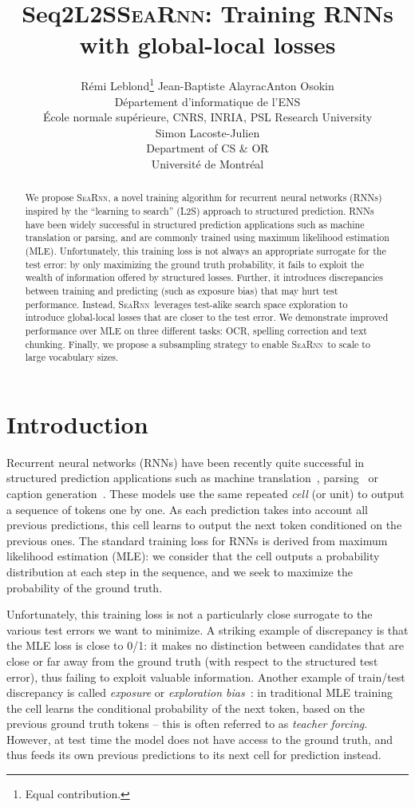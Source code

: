 \documentclass{article}
\title{Seq2L2S}
\author{
	R\'emi Leblond\thanks{Equal contribution.} \qquad Jean-Baptiste Alayrac\footnotemark[1] \qquad Anton Osokin \\
	Département d’informatique de l’ENS \\ 
	École normale supérieure, CNRS, INRIA, PSL Research University\\
	\And
	Simon Lacoste-Julien \\	
	Department of CS \& OR\\
	Université de Montr\'eal
}
\title{\textsc{SeaRnn}: Training RNNs with global-local losses}
\newcommand{\SEARNN}{\textsc{SeaRnn}}
\begin{document}
	\maketitle

	\begin{abstract}
		We propose \SEARNN, a novel training algorithm for recurrent neural networks (RNNs) inspired by the ``learning to search'' (L2S) approach to structured prediction.
		RNNs have been widely successful in structured prediction applications such as machine translation or parsing, and are commonly trained using maximum likelihood estimation (MLE).
		Unfortunately, this training loss is not always an appropriate surrogate for the test error: by only maximizing the ground truth probability, it fails to exploit the wealth of information offered by structured losses.
		Further, it introduces discrepancies between training and predicting (such as exposure bias) that may hurt test performance.
		Instead, \SEARNN\ leverages test-alike search space exploration to introduce global-local losses that are closer to the test error.
		We demonstrate improved performance over MLE on three different tasks: OCR, spelling correction and text chunking.
		Finally, we propose a subsampling strategy to enable \SEARNN\ to scale to large vocabulary sizes.
		\end{abstract}

	\section{Introduction}
	Recurrent neural networks (RNNs) have been recently quite successful in structured prediction applications such as machine translation~\citep{Sutskever2014}, parsing~\citep{Ballesteros2016b} or caption generation~\citep{Vinyals2015}.
	These models use the same repeated \emph{cell} (or unit) to output a sequence of tokens one by one.
	As each prediction takes into account all previous predictions, this cell learns to output the next token conditioned on the previous ones.
	The standard training loss for RNNs is derived from maximum likelihood estimation (MLE): we consider that the cell outputs a probability distribution at each step in the sequence, and we seek to maximize the probability of the ground truth.

	Unfortunately, this training loss is not a particularly close surrogate to the various test errors we want to minimize.
	A striking example of discrepancy is that the MLE loss is close to 0/1: it makes no distinction between candidates that are close or far away from the ground truth (with respect to the structured test error), thus failing to exploit valuable information.
	Another example of train/test discrepancy is called \textit{exposure} or \textit{exploration bias}~\citep{Ranzato2016b}: in traditional MLE training the cell learns the conditional probability of the next token, based on the previous ground truth tokens -- this is often referred to as \textit{teacher forcing}.
	However, at test time the model does not have access to the ground truth, and thus feeds its own previous predictions to its next cell for prediction instead.
\end{document}
